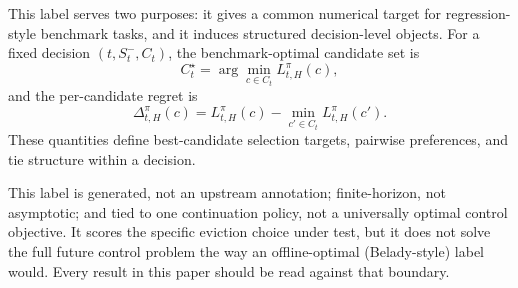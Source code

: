 This label serves two purposes: it gives a common numerical target for
regression-style benchmark tasks, and it induces structured decision-level
objects. For a fixed decision $(t, S_t^{-}, C_t)$, the benchmark-optimal candidate set is
\[
C_t^{\star} = \arg\min_{c \in C_t} L_{t,H}^{\pi}(c),
\]
and the per-candidate regret is
\[
\Delta_{t,H}^{\pi}(c) = L_{t,H}^{\pi}(c) - \min_{c' \in C_t} L_{t,H}^{\pi}(c').
\]
These quantities define best-candidate selection targets, pairwise preferences, and tie structure within a decision.

This label is generated, not an upstream annotation; finite-horizon, not
asymptotic; and tied to one continuation policy, not a universally optimal
control objective. It scores the specific eviction choice under test, but
it does not solve the full future control problem the way an
offline-optimal (Belady-style) label would. Every result in this paper
should be read against that boundary.
